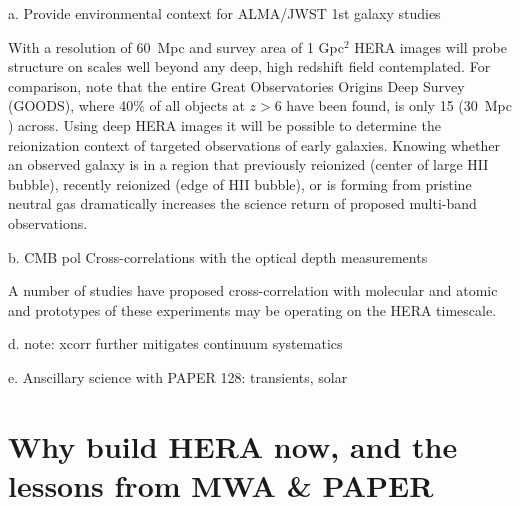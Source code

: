 \documentclass[preprint]{aastex}
\begin{document}




a. Provide environmental context for ALMA/JWST 1st galaxy studies

With a resolution of 60~Mpc and survey area of 1 Gpc$^2$ HERA images will probe structure on scales well beyond any deep, high redshift field contemplated. For comparison, note that the entire Great Observatories Origins Deep Survey (GOODS), where 40\% of all objects at $z > 6$ have been found, is only 15{\arcmin} (30~Mpc ) across. Using deep HERA images it will be possible to determine the reionization context of targeted observations of early galaxies. Knowing whether an observed galaxy is in a region that previously reionized (center of large HII bubble), recently reionized (edge of HII bubble), or is forming from pristine neutral gas dramatically increases the science return of proposed multi-band observations.

b. CMB pol 
Cross-correlations with the optical depth measurements \citep{sarkar_et_al2009,meerburg_et_al2013}

A number of studies have proposed cross-correlation with molecular \cite{lidz_et_al2011} and atomic \citep{gong_et_al2011} and prototypes of these experiments may be operating on the HERA timescale.


  
d. note: xcorr further mitigates continuum systematics

e. Anscillary science with PAPER 128: transients, solar 


\section{Why build HERA now, and the lessons from MWA \& PAPER}
\end{document}
